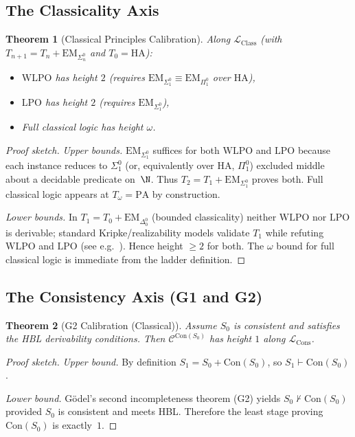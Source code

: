 \documentclass[11pt]{article}
\newtheorem{theorem}{Theorem}[section]
\newcommand{\PA}{\mathrm{PA}}
\newcommand{\HA}{\mathrm{HA}}
\newcommand{\Con}{\mathrm{Con}}
\newcommand{\LCons}{\mathcal{L}_{\mathrm{Cons}}}
\newcommand{\LClass}{\mathcal{L}_{\mathrm{Class}}}
\newcommand{\EM}{\mathrm{EM}}
\newcommand{\LPO}{\mathrm{LPO}}
\newcommand{\WLPO}{\mathrm{WLPO}}
\begin{document}
\subsection{The Classicality Axis}
\begin{theorem}[Classical Principles Calibration]
Along $\LClass$ (with $T_{n+1}=T_n+\EM_{\Sigma^0_n}$ and $T_0=\HA$):
\begin{itemize}
\item $\WLPO$ has height $2$ (requires $\EM_{\Sigma^0_1}\!\equiv\!\EM_{\Pi^0_1}$ over $\HA$),
\item $\LPO$ has height $2$ (requires $\EM_{\Sigma^0_1}$),
\item Full classical logic has height $\omega$.
\end{itemize}
\end{theorem}

\begin{proof}[Proof sketch]
\emph{Upper bounds.} $\EM_{\Sigma^0_1}$ suffices for both $\WLPO$ and $\LPO$ because each instance
reduces to $\Sigma^0_1$ (or, equivalently over $\HA$, $\Pi^0_1$) excluded middle about a decidable
predicate on~$\N$. Thus $T_2=T_1+\EM_{\Sigma^0_1}$ proves both. Full classical logic appears at
$T_\omega=\PA$ by construction.

\emph{Lower bounds.} In $T_1=T_0+\EM_{\Delta^0_0}$ (bounded classicality) neither $\WLPO$ nor $\LPO$
is derivable; standard Kripke/realizability models validate $T_1$ while refuting $\WLPO$ and $\LPO$
(see e.g.\ \cite[§I.2–I.3]{HajekPudlak}). Hence height $\ge 2$ for both. The $\omega$ bound for full
classical logic is immediate from the ladder definition.
\end{proof}

\subsection{The Consistency Axis (G1 and G2)}
\begin{theorem}[G2 Calibration (Classical)]
Assume $S_0$ is consistent and satisfies the HBL derivability conditions.
Then $\mathcal C^{\Con(S_0)}$ has height $1$ along $\LCons$.
\end{theorem}

\begin{proof}[Proof sketch]
\emph{Upper bound.} By definition $S_1=S_0+\Con(S_0)$, so $S_1\vdash\Con(S_0)$.

\emph{Lower bound.} Gödel's second incompleteness theorem (G2) yields $S_0\nvdash\Con(S_0)$ provided
$S_0$ is consistent and meets HBL. Therefore the least stage proving $\Con(S_0)$ is exactly~$1$.
\end{proof}
\end{document}

